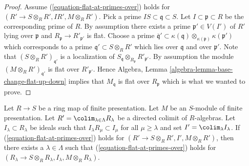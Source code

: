 \begin{proof}
Assume (\ref{equation-flat-at-primes-over}) holds for
$(R' \to S \otimes_R R', IR', M \otimes_R R')$. Pick a prime
$IS \subset \mathfrak q \subset S$. Let $I \subset \mathfrak p \subset R$
be the corresponding prime of $R$. By assumption there exists
a prime $\mathfrak p' \in V(I')$ of $R'$ lying over $\mathfrak p$ and
$R_{\mathfrak p} \to R'_{\mathfrak p'}$ is flat. Choose a prime
$\overline{\mathfrak q}' \subset
\kappa(\mathfrak q) \otimes_{\kappa(\mathfrak p)} \kappa(\mathfrak p')$
which corresponds to a prime $\mathfrak q' \subset S \otimes_R R'$ which
lies over $\mathfrak q$ and over $\mathfrak p'$. Note that
$(S \otimes_R R')_{\mathfrak q'}$ is a localization of
$S_{\mathfrak q} \otimes_{R_{\mathfrak p}} R'_{\mathfrak p'}$.
By assumption the module $(M \otimes_R R')_{\mathfrak q'}$ is
flat over $R'_{\mathfrak p'}$. Hence
Algebra, Lemma \ref{algebra-lemma-base-change-flat-up-down}
implies that $M_{\mathfrak q}$ is flat over $R_{\mathfrak p}$
which is what we wanted to prove.
\end{proof}

\begin{lemma}
\label{lemma-limit-preserving-flat-at-primes-over}
Let $R \to S$ be a ring map of finite presentation.
Let $M$ be an $S$-module of finite presentation.
Let $R' = \colim_{\lambda \in \Lambda} R_\lambda$
be a directed colimit of $R$-algebras. Let $I_\lambda \subset R_\lambda$
be ideals such that $I_\lambda R_\mu \subset I_\mu$ for all $\mu \geq \lambda$
and set $I' = \colim_\lambda I_\lambda$.
If (\ref{equation-flat-at-primes-over}) holds for
$(R' \to S \otimes_R R', I', M \otimes_R R')$, then there exists
a $\lambda \in \Lambda$ such that
(\ref{equation-flat-at-primes-over}) holds for
$(R_\lambda \to S \otimes_R R_\lambda, I_\lambda, M \otimes_R R_\lambda)$.
\end{lemma}

